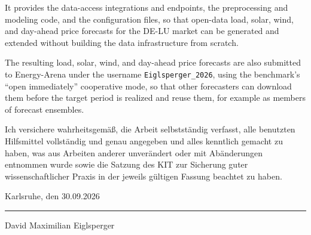\documentclass[
  paper=a4,
  fontsize=10pt,
  toc=bib,
  titlepage=firstiscover,
  headings=big
]{scrartcl}
\theoremstyle{definition}
\begin{document}
\noindent It provides the data-access integrations and endpoints, the
preprocessing and modeling code, and the configuration files, so that open-data
load, solar, wind, and day-ahead price forecasts for the \mbox{DE-LU} market can be
generated and extended without building the data infrastructure from scratch.

\noindent The resulting load, solar, wind, and day-ahead price forecasts are also
submitted to Energy-Arena
\cite{kleinebrahm2026energyarena} under the username
\nolinkurl{Eiglsperger_2026}, using the benchmark's \enquote{open immediately} cooperative
mode, so that other forecasters can download them before the target period is
realized and reuse them, for example as members of forecast ensembles.


\clearpage
\pagestyle{plain}
\printbibliography
\clearpage

\thispagestyle{empty}
\vspace*{4.0cm}

\noindent
\begin{sloppypar}
Ich versichere wahrheitsgem\"a\ss, die Arbeit selbstst\"andig verfasst, alle
benutzten Hilfsmittel vollst\"andig und genau angegeben und alles kenntlich
gemacht zu haben, was aus Arbeiten anderer unver\"andert oder mit
Ab\"anderungen entnommen wurde sowie die Satzung des KIT zur Sicherung guter
wissenschaftlicher Praxis in der jeweils g\"ultigen Fassung beachtet zu haben.
\end{sloppypar}

\vspace{2.0cm}

\noindent
\begin{minipage}[t]{0.45\textwidth}
Karlsruhe, den 30.09.2026
\end{minipage}
\hfill
\begin{minipage}[t]{0.35\textwidth}
\hrule
\vspace{0.3cm}
David Maximilian Eiglsperger
\end{minipage}

\clearpage

\pagestyle{empty}
\end{document}
